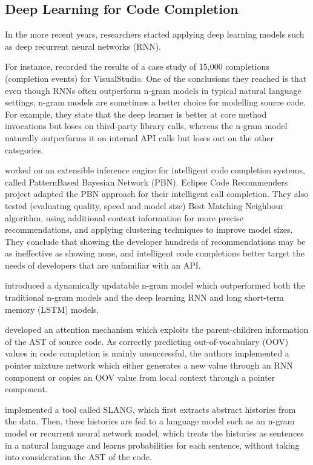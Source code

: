 \documentclass[sigplan,screen]{acmart}
\begin{document}
\subsection{Deep Learning for Code Completion}
In the more recent years, researchers started applying deep learning models such as deep recurrent neural networks (RNN).

For instance, \cite{Hell19a} recorded the results of a case study of 15,000 completions (completion events) for VisualStudio. One of the conclusions they reached is that even though RNNs often outperform n-gram models in typical natural language settings, n-gram models are sometimes a better choice for modelling source code. For example, they state that the deep learner is better at core method invocations but loses on third-party library calls, whereas the n-gram model naturally outperforms it on internal API calls but loses out on the other categories.

\cite{Prok15a} worked on an extensible inference engine for intelligent code completion systems, called PatternBased Bayesian Network (PBN). Eclipse Code Recommenders project adapted the PBN approach for their intelligent call completion. They also tested (evaluating quality, speed and model size) Best Matching Neighbour algorithm, using additional context information for more precise recommendations, and applying clustering techniques to improve model sizes. They conclude that showing the developer hundreds of recommendations may be as ineffective as showing none, and intelligent code completions better target the needs of developers that are unfamiliar with an API.

\cite{Hell17a} introduced a dynamically updatable n-gram model which outperformed both the traditional n-gram models and the deep learning RNN and long short-term memory (LSTM) models.

\cite{Li17a} developed an attention mechanism which exploits the parent-children information of the AST of source code. As correctly predicting out-of-vocabulary (OOV) values in code completion is mainly unsuccessful, the authors implemented a pointer mixture network which either generates a new value through an RNN component or copies an OOV value from local context through a pointer component.

\cite{Rayc14a} implemented a tool called SLANG, which first extracts abstract histories from the data. Then, these histories are fed to a language model such as an n-gram model or recurrent neural network model, which treats the histories as sentences in a natural language and learns probabilities for each sentence, without taking into consideration the AST of the code.
\end{document}
